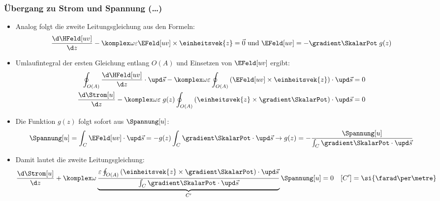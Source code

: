 \begin{frame}
  \frametitle{Übergang zu Strom und Spannung (\dots)}
  \begin{itemize}[<+->]
  \item Analog folgt die \alert{zweite Leitungsgleichung} aus den Formeln:
          \begin{equation*}
        \frac{\d \HFeld[uv]}{\d z} - \komplex\omega\varepsilon\EFeld[uv] \times\einheitsvek{z} =\vec{0} \text{ und } \EFeld[uv] = -\gradient\SkalarPot \; g(z)
      \end{equation*}
      \item Umlaufintegral der ersten Gleichung entlang \(O(A)\) und Einsetzen von \(\EFeld[uv]\) ergibt: 
          \begin{align*}
            \oint_{O(A)} \frac{\d \HFeld[uv]}{\d z} \cdot \upd \vec{s} - \komplex\omega\varepsilon \oint_{O(A)}\left(\EFeld[uv] \times\einheitsvek{z}\right) \cdot \upd \vec{s} &= 0  \\
            \frac{\d \Strom[u]}{\d z} -\komplex\omega\varepsilon\; g(z) \oint_{O(A)}\left(\einheitsvek{z}\times \gradient\SkalarPot\right) \cdot \upd \vec{s} &= 0 
          \end{align*}
        \item Die Funktion \(g(z)\) folgt sofort aus \(\Spannung[u]\):
          \begin{equation*}
\Spannung[u] = \int_C \EFeld[uv]\cdot\upd\vec{s} = -g(z) \int_C \gradient\SkalarPot\cdot\upd\vec{s} \to g(z) = -\frac{\Spannung[u]}{\int_C \gradient\SkalarPot\cdot\upd\vec{s}}
\end{equation*}
\item Damit lautet die \alert{zweite Leitungsgleichung}:
  \begin{equation*}
    \frac{\d \Strom[u]}{\d z} +\komplex\omega \underbrace{\frac{\varepsilon\oint_{O(A)}\left(\einheitsvek{z}\times \gradient\SkalarPot\right) \cdot \upd \vec{s}}{\int_C \gradient\SkalarPot\cdot\upd\vec{s}}}_{C^\prime} \Spannung[u] = 0 \quad [C^\prime]=\si{\farad\per\metre}
    \end{equation*}
  \end{itemize}
\end{frame}

